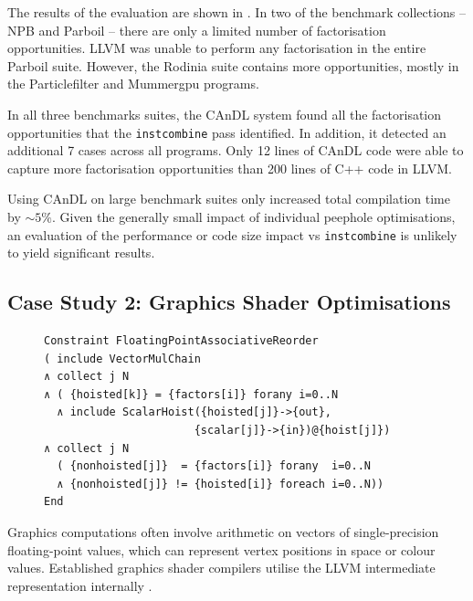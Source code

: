     The results of the evaluation are shown in
    .
    In two of the benchmark collections -- NPB and Parboil -- there are
    only a limited number of factorisation opportunities.
    LLVM was unable to perform any factorisation in the entire Parboil suite.
    However, the Rodinia suite contains more opportunities, mostly in the
    Particlefilter and Mummergpu programs.

    In all three benchmarks suites, the CAnDL system found all the factorisation
    opportunities that the \texttt{instcombine} pass identified.
    In addition, it detected an additional 7 cases across all programs.
    Only 12 lines of CAnDL code were able to capture more factorisation
    opportunities than 200 lines of C++ code in LLVM.

    Using CAnDL on large benchmark suites only increased total compilation time
    by \mbox{$\sim5\%$}.
    Given the generally small impact of individual peephole optimisations, an
    evaluation of the performance or code size impact vs {\tt instcombine} is
    unlikely to yield significant results.

\subsection{Case Study 2: Graphics Shader Optimisations}

\begin{figure}[t]
\begin{lstlisting}[language=CAnDL,label={fig:Lewis},caption=
   {CAnDL defines multiplication chains with genuine vectors and hoisted
    scalars:
    After separating the two cases, some of the multiplications can be performed
    on scalars instead.\parfillskip=0pt}]
Constraint FloatingPointAssociativeReorder
( include VectorMulChain
∧ collect j N
∧ ( {hoisted[k]} = {factors[i]} forany i=0..N
  ∧ include ScalarHoist({hoisted[j]}->{out},
                       {scalar[j]}->{in})@{hoist[j]})
∧ collect j N
  ( {nonhoisted[j]}  = {factors[i]} forany  i=0..N
  ∧ {nonhoisted[j]} != {hoisted[i]} foreach i=0..N))
End
\end{lstlisting}
\end{figure}

    Graphics computations often involve arithmetic on vectors of
    single-precision floating-point values, which can represent vertex positions
    in space or colour values.
    Established graphics shader compilers utilise the LLVM intermediate
    representation internally \citep{cudacompiler}.

